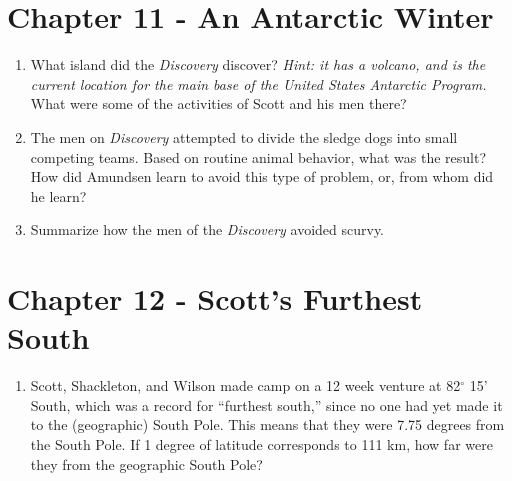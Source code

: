 \documentclass{article}
\begin{document}
\section{Chapter 11 - An Antarctic Winter}
\begin{enumerate}
\item What island did the \textit{Discovery} discover? \textit{Hint: it has a volcano, and is the current location for the main base of the United States Antarctic Program.}  What were some of the activities of Scott and his men there?  \\ \vspace{2cm}
\item The men on \textit{Discovery} attempted to divide the sledge dogs into small competing teams.  Based on routine animal behavior, what was the result?  How did Amundsen learn to avoid this type of problem, or, from whom did he learn?  \\ \vspace{2cm}
\item Summarize how the men of the \textit{Discovery} avoided scurvy. \\ \vspace{2cm}
\end{enumerate}
\section{Chapter 12 - Scott's Furthest South}
\begin{enumerate}
\item Scott, Shackleton, and Wilson made camp on a 12 week venture at 82$^{\circ}$ 15' South, which was a record for ``furthest south,'' since no one had yet made it to the (geographic) South Pole.  This means that they were 7.75 degrees from the South Pole.  If 1 degree of latitude corresponds to 111 km, how far were they from the geographic South Pole? 
\end{enumerate}
\end{document}
